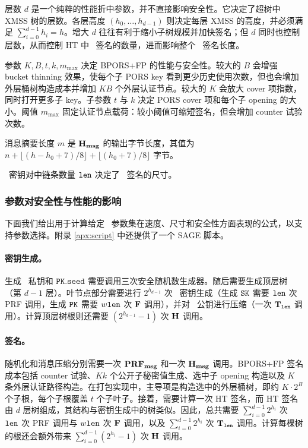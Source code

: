 层数 $d$ 是一个纯粹的性能折中参数，并不直接影响安全性。它决定了超树中 XMSS 树的层数。各层高度 $(h_0,\ldots,h_{d-1})$ 则决定每层 XMSS 的高度，并必须满足 $\sum_{i=0}^{d-1} h_i = h$。增大 $d$ 往往有利于缩小子树规模并加快签名；但 $d$ 同时也控制层数，从而控制 HT 中 \WOTSCS\ 签名的数量，进而影响整个 \SPHINCSA\ 签名长度。

参数 $K,B,t,k,m_{\max}$ 决定 BPORS+FP 的性能与安全性。较大的 $B$ 会增强 bucket thinning 效果，使每个子 PORS key 看到更少历史使用次数，但也会增加外层桶树构造成本并增加 $KB$ 个外层认证节点。较大的 $K$ 会放大 cover 项指数，同时打开更多子 key。子参数 $t$ 与 $k$ 决定 PORS cover 项和每个子 opening 的大小。阈值 $m_{\max}$ 固定认证节点载荷：较小阈值可缩短签名，但会增加 counter 试验次数。

消息摘要长度 $m$ 是 $\mathbf{H_{msg}}$ 的输出字节长度，其值为 $n+\lfloor(h-h_0+7)/8\rfloor+\lfloor(h_0+7)/8\rfloor$ 字节。

\WOTSCS\ 密钥对中链条数量 $\mathtt{len}$ 决定了 \WOTSCS\ 签名的尺寸。

\subsubsection{参数对安全性与性能的影响} \label{sec:securityandperformance}

下面我们给出用于计算给定 \SPHINCSA\ 参数集在速度、尺寸和安全性方面表现的公式，以支持参数选择。附录 \ref{apx:script} 中还提供了一个 SAGE 脚本。

\paragraph{密钥生成。}
生成 \SPHINCSA\ 私钥和 $\pk.\seed$ 需要调用三次安全随机数生成器。随后需要生成顶层树（第 $d-1$ 层）。叶节点部分需要进行 $2^{h_{d-1}}$ 次 \WOTSCS\ 密钥生成（生成 $\sk$ 需要 $\mathtt{len}$ 次 PRF 调用，生成 $\pk$ 需要 $w \mathtt{len}$ 次 $\mathbf{F}$ 调用），并对 \WOTSCS\ 公钥进行压缩（一次 $\mathbf{T}_{\mathtt{len}}$ 调用）。计算顶层树根则还需要 $(2^{h_{d-1}}-1)$ 次 $\mathbf{H}$ 调用。

\paragraph{签名。}
随机化和消息压缩分别需要一次 $\mathbf{PRF_{msg}}$ 和一次 $\mathbf{H_{msg}}$ 调用。BPORS+FP 签名成本包括 counter 试验、$Kk$ 个公开子秘密值生成、选中子 opening 构造以及 $K$ 条外层认证路径构造。在打包实现中，主导项是构造选中的外层桶树，即约 $K\cdot2^B$ 个子根，每个子根覆盖 $t$ 个子叶子。接着，需要计算一次 HT 签名，而 HT 签名由 $d$ 层树组成，其结构与密钥生成中的树类似。因此，总共需要 $\sum_{i=0}^{d-1} 2^{h_i}$ 次 $\mathtt{len}$ 次 PRF 调用与 $w \mathtt{len}$ 次 $\mathbf{F}$ 调用，以及 $\sum_{i=0}^{d-1} 2^{h_i}$ 次 $\mathbf{T}_{\mathtt{len}}$ 调用。计算每棵树的根还会额外带来 $\sum_{i=0}^{d-1} (2^{h_i}-1)$ 次 $\mathbf{H}$ 调用。

